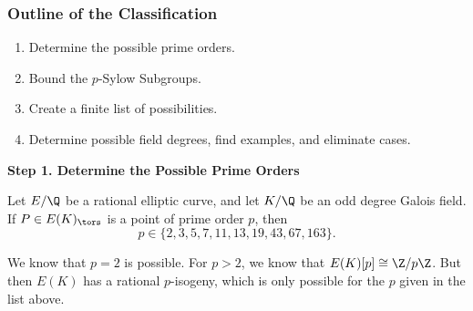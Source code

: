 
\begin{frame}[plain]
\end{frame}





\begin{frame}[plain]
\frametitle{Outline of the Classification}
        \begin{enumerate}
        \item Determine the possible prime orders. \vfill
        \item Bound the $p$-Sylow Subgroups. \vfill
        \item Create a finite list of possibilities. \vfill
        \item Determine possible field degrees, find examples, and eliminate cases. \vfill
        \end{enumerate}
\vfill
\end{frame}





\begin{frame}[plain]
\vfill
\begin{center} {\bfseries \Large \textcolor{UniGray}{Step 1. Determine the Possible Prime Orders}} \end{center}
\vfill 
\end{frame}





\begin{frame}[plain]
\begin{lem}
Let $E/\Q$ be a rational elliptic curve, and let $K/\Q$ be an odd degree Galois field. If $P \in E(K)_\tors$ is a point of prime order $p$, then
	\[
	p \in \{ 2, 3, 5, 7, 11, 13, 19, 43, 67, 163 \}.
	\]
\end{lem} \pspace

\pf We know that $p= 2$ is possible. For $p > 2$, we know that $E(K)[p] \cong \Z/p\Z$. But then $E(K)$ has a rational $p$-isogeny, which is only possible for the $p$ given in the list above. 
\end{frame}





